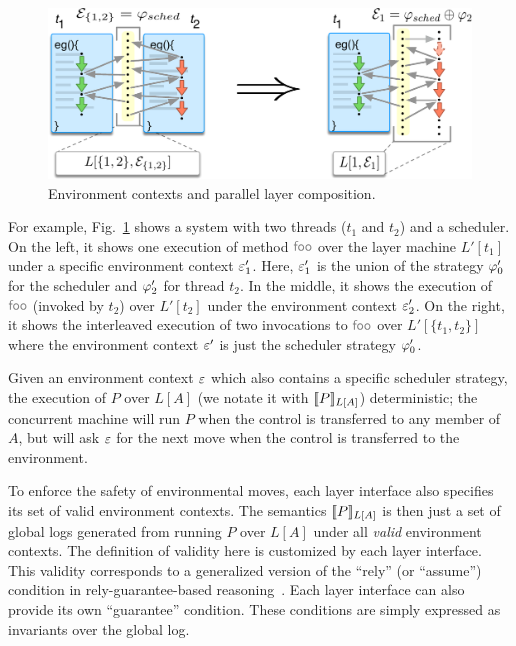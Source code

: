 \begin{figure}[t]
\centering
\includegraphics[scale=.38]{figs/ccal/pcomp}
\caption{Environment contexts and parallel layer composition.}
\label{fig:pcomp}
\end{figure}

For example, Fig.~\ref{fig:pcomp} shows a system with two threads
($t_1$ and $t_2$) and a scheduler. On the left, it shows one execution
of method $\commc{foo}$ over the layer machine $L'[t_1]$ under a specific
environment context $\oracle'_1$.  Here, $\oracle'_1$ is the union of
the strategy $\stratp{0}$ for the scheduler and $\stratp{2}$ for
thread $t_2$. In the middle, it shows the execution of $\commc{foo}$
(invoked by $t_2$) over $L'[t_2]$ under the environment context
$\oracle'_2$. On the right, it shows the interleaved execution of
two invocations to $\commc{foo}$ over $L'[\{t_1,t_2\}]$
where the environment context $\oracle'$ is just the scheduler
strategy $\stratp{0}$.

Given an environment context $\oracle$ which also contains a specific
scheduler strategy, the execution of $P$ over $L[A]$ (we notate it with $\sem{L[A]}{P}$)
deterministic; the concurrent machine will run $P$ when the control is
transferred to any member of $A$, but will ask $\oracle$ for the next
move when the control is transferred to the environment.

To enforce the safety of environmental moves,
each layer interface also specifies its set of valid environment contexts.
The semantics $\sem{L[A]}{P}$ is then just a set of global logs
generated from running $P$ over $L[A]$ under all {\em valid}
environment contexts. 
The definition of validity here is customized
by each layer interface.
This validity  corresponds to a generalized version of
the ``rely'' (or ``assume'') condition in rely-guarantee-based
reasoning~\cite{feng07:sagl,vafeiadis:marriage,LRG,fu10:roch,sergey15}. Each layer interface can also
provide its own ``guarantee'' condition. These conditions  are simply expressed as
invariants over the global log. 


